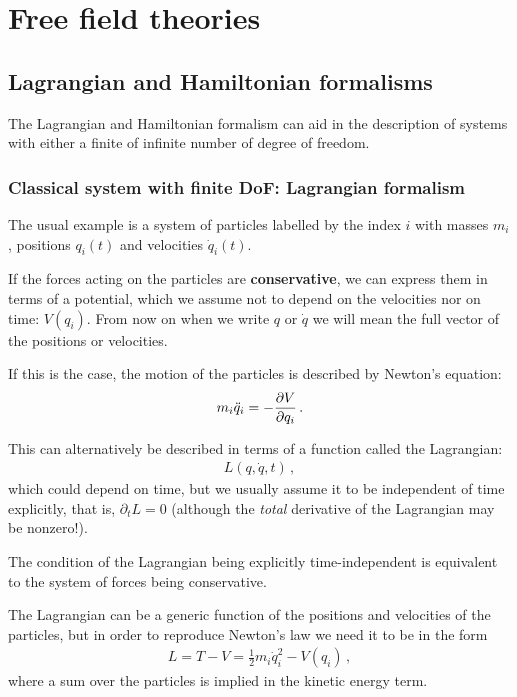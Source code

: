 \documentclass[main.tex]{subfiles}
\begin{document}
\chapter{Free field theories}

\section{Lagrangian and Hamiltonian formalisms}


The Lagrangian and Hamiltonian formalism can aid in the description of systems with either a finite of infinite number of degree of freedom. 

\subsection{Classical system with finite DoF: Lagrangian formalism}

The usual example is a system of particles labelled by the index \(i\) with masses \(m_i\), positions \(q_i (t)\) and velocities \(\dot{q}_{i}(t)\).

If the forces acting on the particles are \textbf{conservative}, we can express them in terms of a potential, which we assume not to depend on the velocities nor on time: \(V(q_{i})\).
From now on when we write \(q\) or \(\dot{q}\) we will mean the full vector of the positions or velocities.

If this is the case, the motion of the particles is described by Newton's equation: 
%
\begin{align}
m_i \ddot{q}_{i} = - \pdv{V}{q_{i}}
\,.
\end{align}

This can alternatively be described in terms of a function called the Lagrangian: 
%
\begin{align}
L(q, \dot{q}, t)
\,,
\end{align}
%
which could depend on time, but we usually assume it to be independent of time explicitly, that is, \(\partial_{t} L = 0\) (although the \emph{total} derivative of the Lagrangian may be nonzero!).

The condition of the Lagrangian being explicitly time-independent is equivalent to the system of forces being conservative.

The Lagrangian can be a generic function of the positions and velocities of the particles, but in order to reproduce Newton's law we need it to be in the form 
%
\begin{align}
L = T-V = \frac{1}{2} m_i \dot{q}_i^2 - V(q_i)
\,,
\end{align}
%
where a sum over the particles is implied in the kinetic energy term.
\end{document}
